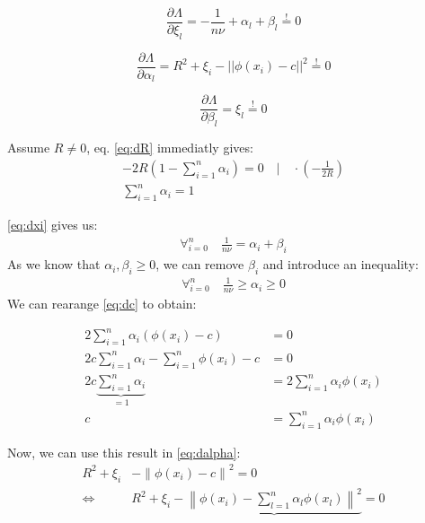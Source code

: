 \begin{equation}
    \label{eq:dxi}
    \frac{\partial \Lambda}{\partial \xi_l} =
        - \frac{1}{n \nu} + \alpha_l + \beta_l \stackrel{!}{=} 0
\end{equation}

\begin{equation}
    \label{eq:dalpha}
    \frac{\partial \Lambda}{\partial \alpha_l} =
        R^2 +  \xi_i - || \phi(x_i) - c||^2  \stackrel{!}{=} 0
\end{equation}

\begin{equation}
    \label{eq:dbeta}
    \frac{\partial \Lambda}{\partial \beta_l} =
        \xi_l \stackrel{!}{=} 0
\end{equation}

Assume $R \neq 0$, eq. \eqref{eq:dR} immediatly gives:
\begin{align}
    - 2 R \left( 1 - \sum_{i=1}^n \alpha_i \right) = 0  \quad | \quad \cdot \left( - \frac{1}{2 R} \right) \\
    \sum_{i=1}^n \alpha_i  = 1
\end{align}

\eqref{eq:dxi} gives us:
\begin{align}
    \label{eq:n_eq_alpha_beta}
    \forall_{i=0}^n \quad \frac{1}{n \nu} =  \alpha_i + \beta_i
\end{align}
As we know that $\alpha_i, \beta_i  \ge 0 $, we can remove $\beta_i$ and
introduce an inequality:
\begin{align}
    \label{eq:}
    \forall_{i=0}^n \quad \frac{1}{n \nu} \ge  \alpha_i \ge 0
\end{align}
We can rearange \eqref{eq:dc} to obtain:

\begin{align}
    2 \sum_{i=1}^n \alpha_i \left(\phi(x_i) - c \right) &= 0 \\
    2 c \sum_{i=1}^n \alpha_i  - \sum_{i=1}^n \phi(x_i) - c  &= 0 \\
     2 c \underbrace{\sum_{i=1}^n \alpha_i}_{=1}  &= 2 \sum_{i=1}^n \alpha_i \phi(x_i)    \\
     c &= \sum_{i=1}^n \alpha_i \phi(x_i)
\end{align}


Now, we can use this result in \eqref{eq:dalpha}:
\renewcommand{\norm}[1]{\left\lVert#1\right\rVert}
\begin{align}
    \label{eq:}
        R^2 +  \xi_i & - \norm{\phi(x_i) - c}^2  = 0 \\
        \iff &
        R^2 +  \xi_i - \underbrace{\norm{\phi(x_i) -\sum_{l=1}^n \alpha_l \phi(x_l) }^2}_{}  = 0 \\
\end{align}

